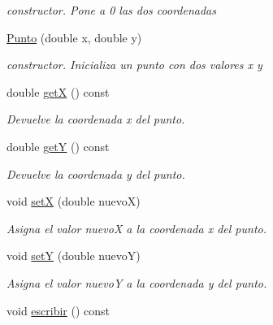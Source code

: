 \begin{DoxyCompactItemize}
\begin{DoxyCompactList}\small\item\em constructor. Pone a 0 las dos coordenadas \end{DoxyCompactList}\item 
\hyperlink{classPunto_a911bb8d88eaa1f9904a27b0e159a51c0}{Punto} (double x, double y)\hypertarget{classPunto_a911bb8d88eaa1f9904a27b0e159a51c0}{}\label{classPunto_a911bb8d88eaa1f9904a27b0e159a51c0}

\begin{DoxyCompactList}\small\item\em constructor. Inicializa un punto con dos valores x y \end{DoxyCompactList}\item 
double \hyperlink{classPunto_aa218292fec9bad5ec6d71d4bd9173d9d}{getX} () const \hypertarget{classPunto_aa218292fec9bad5ec6d71d4bd9173d9d}{}\label{classPunto_aa218292fec9bad5ec6d71d4bd9173d9d}

\begin{DoxyCompactList}\small\item\em Devuelve la coordenada x del punto. \end{DoxyCompactList}\item 
double \hyperlink{classPunto_a214978b8bbae48ca5927f2e56fb3bd22}{getY} () const \hypertarget{classPunto_a214978b8bbae48ca5927f2e56fb3bd22}{}\label{classPunto_a214978b8bbae48ca5927f2e56fb3bd22}

\begin{DoxyCompactList}\small\item\em Devuelve la coordenada y del punto. \end{DoxyCompactList}\item 
void \hyperlink{classPunto_a51ae6616f828bb2b4111bc8ace49dbca}{setX} (double nuevoX)\hypertarget{classPunto_a51ae6616f828bb2b4111bc8ace49dbca}{}\label{classPunto_a51ae6616f828bb2b4111bc8ace49dbca}

\begin{DoxyCompactList}\small\item\em Asigna el valor nuevoX a la coordenada x del punto. \end{DoxyCompactList}\item 
void \hyperlink{classPunto_a6a0f8adb5946f31a7867a06f54d97462}{setY} (double nuevoY)\hypertarget{classPunto_a6a0f8adb5946f31a7867a06f54d97462}{}\label{classPunto_a6a0f8adb5946f31a7867a06f54d97462}

\begin{DoxyCompactList}\small\item\em Asigna el valor nuevoY a la coordenada y del punto. \end{DoxyCompactList}\item 
void \hyperlink{classPunto_afc543b48134f632fa354d8b027954e80}{escribir} () const \hypertarget{classPunto_afc543b48134f632fa354d8b027954e80}{}\label{classPunto_afc543b48134f632fa354d8b027954e80}


\end{DoxyCompactItemize}
